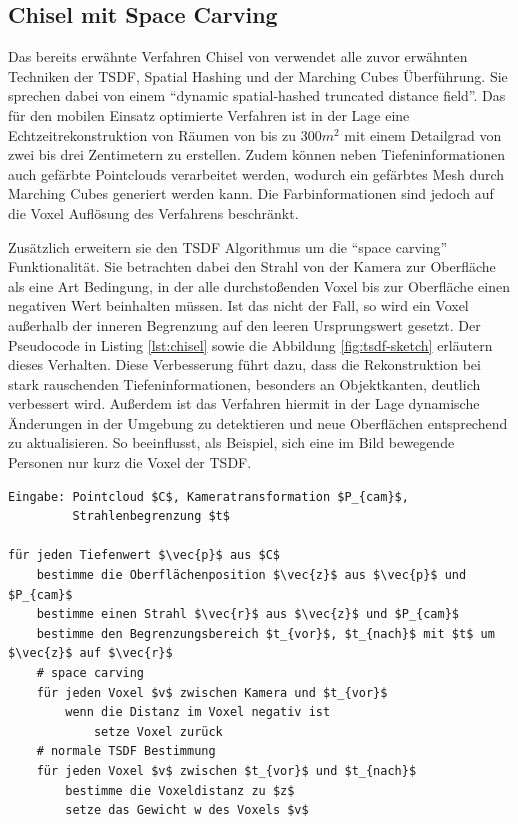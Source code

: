 \subsection{Chisel mit Space Carving} \label{sec:chisel}

Das bereits erwähnte Verfahren Chisel von \citet{Klingensmith_2015_7924} verwendet alle zuvor erwähnten Techniken der TSDF, Spatial Hashing und der Marching Cubes Überführung. Sie sprechen dabei von einem \enquote{dynamic spatial-hashed truncated distance field}. Das für den mobilen Einsatz optimierte Verfahren ist in der Lage eine Echtzeitrekonstruktion von Räumen von bis zu \(300 m^2\) mit einem Detailgrad von zwei bis drei Zentimetern zu erstellen. Zudem können neben Tiefeninformationen auch gefärbte Pointclouds verarbeitet werden, wodurch ein gefärbtes Mesh durch Marching Cubes generiert werden kann. Die Farbinformationen sind jedoch auf die Voxel Auflösung des Verfahrens beschränkt. \citep{Klingensmith_2015_7924}

Zusätzlich erweitern sie den TSDF Algorithmus um die \enquote{space carving} Funktionalität. Sie betrachten dabei den Strahl von der Kamera zur Oberfläche als eine Art Bedingung, in der alle durchstoßenden Voxel bis zur Oberfläche einen negativen Wert beinhalten müssen. Ist das nicht der Fall, so wird ein Voxel außerhalb der inneren Begrenzung auf den leeren Ursprungswert gesetzt. Der Pseudocode in Listing \ref{lst:chisel} sowie die Abbildung \ref{fig:tsdf-sketch} erläutern dieses Verhalten. Diese Verbesserung führt dazu, dass die Rekonstruktion bei stark rauschenden Tiefeninformationen, besonders an Objektkanten, deutlich verbessert wird. Außerdem ist das Verfahren hiermit in der Lage dynamische Änderungen in der Umgebung zu detektieren und neue Oberflächen entsprechend zu aktualisieren. So beeinflusst, als Beispiel, sich eine im Bild bewegende Personen nur kurz die Voxel der TSDF. \citep{Klingensmith_2015_7924}


\begin{lstlisting}[mathescape,caption=Chisel TSDF Algorithmus, label=lst:chisel, float=htbp]
Eingabe: Pointcloud $C$, Kameratransformation $P_{cam}$, 
         Strahlenbegrenzung $t$

für jeden Tiefenwert $\vec{p}$ aus $C$
    bestimme die Oberflächenposition $\vec{z}$ aus $\vec{p}$ und $P_{cam}$
    bestimme einen Strahl $\vec{r}$ aus $\vec{z}$ und $P_{cam}$
    bestimme den Begrenzungsbereich $t_{vor}$, $t_{nach}$ mit $t$ um $\vec{z}$ auf $\vec{r}$
    # space carving
    für jeden Voxel $v$ zwischen Kamera und $t_{vor}$
        wenn die Distanz im Voxel negativ ist
            setze Voxel zurück
    # normale TSDF Bestimmung
    für jeden Voxel $v$ zwischen $t_{vor}$ und $t_{nach}$
        bestimme die Voxeldistanz zu $z$
        setze das Gewicht w des Voxels $v$
\end{lstlisting}

